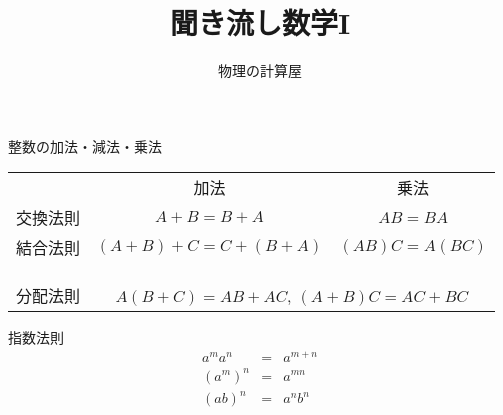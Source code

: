 \documentclass[aspectratio=169, 12pt]{beamer}
\title{聞き流し数学I}
\author[物理の計算屋]{物理の計算屋}
\date{}
\begin{document}
\frame{\maketitle}



\begin{frame}{整数の加法・減法・乗法}
    \begin{table}[h]
        \centering
        \begin{tabular}{ccc}
                 & 加法                                                 & 乗法              \\
            交換法則 & $ A+B=B+A $                                        & $ AB=BA $       \\
            結合法則 & $ (A+B)+C=C+(B+A) $                                & $ (AB)C=A(BC) $ \\
                 &                                                    &                 \\
            \\
            \\
            分配法則 & \multicolumn{2}{c}{$A(B+C)=AB+AC$, $(A+B)C=AC+BC$}                   \\
        \end{tabular}
    \end{table}
\end{frame}

\begin{frame}{指数法則}
    \begin{eqnarray*}
        a^ma^n&=&a^{m+n} \\
        (a^m)^n&=&a^{mn} \\
        (ab)^n&=&a^nb^n
    \end{eqnarray*}
\end{frame}
\end{document}
